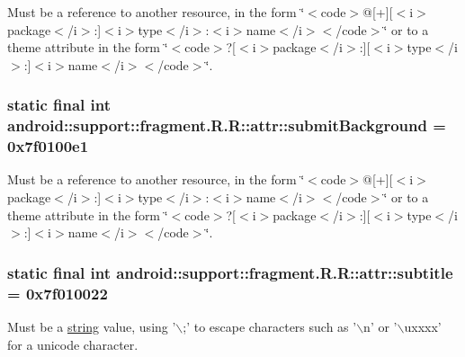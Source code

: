 Must be a reference to another resource, in the form \char`\"{}$<$code$>$@\mbox{[}+\mbox{]}\mbox{[}$<$i$>$package$<$/i$>$:\mbox{]}$<$i$>$type$<$/i$>$:$<$i$>$name$<$/i$>$$<$/code$>$\char`\"{} or to a theme attribute in the form \char`\"{}$<$code$>$?\mbox{[}$<$i$>$package$<$/i$>$:\mbox{]}\mbox{[}$<$i$>$type$<$/i$>$:\mbox{]}$<$i$>$name$<$/i$>$$<$/code$>$\char`\"{}. \hypertarget{classandroid_1_1support_1_1fragment_1_1_r_1_1attr_a11b7766edc70a6bf7b9db234829cd73}{
\subsubsection[{submitBackground}]{\setlength{\rightskip}{0pt plus 5cm}static final int android::support::fragment.R.R::attr::submitBackground = 0x7f0100e1}}
\label{classandroid_1_1support_1_1fragment_1_1_r_1_1attr_a11b7766edc70a6bf7b9db234829cd73}


Must be a reference to another resource, in the form \char`\"{}$<$code$>$@\mbox{[}+\mbox{]}\mbox{[}$<$i$>$package$<$/i$>$:\mbox{]}$<$i$>$type$<$/i$>$:$<$i$>$name$<$/i$>$$<$/code$>$\char`\"{} or to a theme attribute in the form \char`\"{}$<$code$>$?\mbox{[}$<$i$>$package$<$/i$>$:\mbox{]}\mbox{[}$<$i$>$type$<$/i$>$:\mbox{]}$<$i$>$name$<$/i$>$$<$/code$>$\char`\"{}. \hypertarget{classandroid_1_1support_1_1fragment_1_1_r_1_1attr_561fa53bbe98b368fa9fe9de1e3e6d94}{
\subsubsection[{subtitle}]{\setlength{\rightskip}{0pt plus 5cm}static final int android::support::fragment.R.R::attr::subtitle = 0x7f010022}}
\label{classandroid_1_1support_1_1fragment_1_1_r_1_1attr_561fa53bbe98b368fa9fe9de1e3e6d94}


Must be a \hyperlink{classandroid_1_1support_1_1fragment_1_1_r_1_1string}{string} value, using '$\backslash$;' to escape characters such as '$\backslash$n' or '$\backslash$uxxxx' for a unicode character. 


